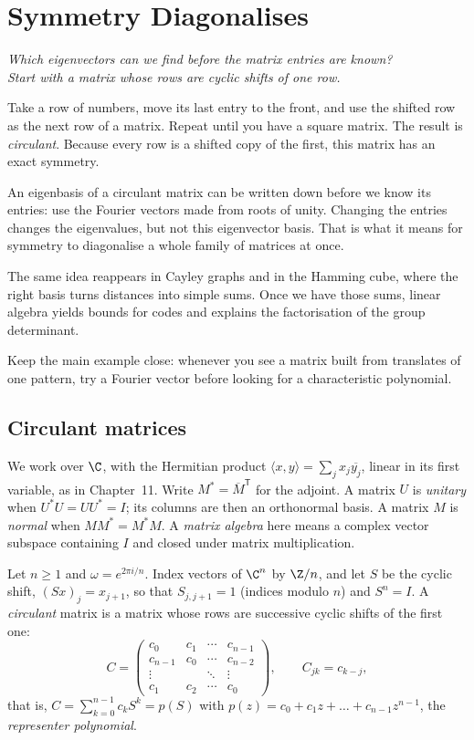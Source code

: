 \chapter{Symmetry Diagonalises}\label{linear:ch:symmetry}

\begin{center}\itshape
Which eigenvectors can we find before the matrix entries are known?\\
Start with a matrix whose rows are cyclic shifts of one row.
\end{center}

Take a row of numbers, move its last entry to the front, and use the shifted row as the next row of a matrix. Repeat until you have a square matrix. The result is \emph{circulant}. Because every row is a shifted copy of the first, this matrix has an exact symmetry.

An eigenbasis of a circulant matrix can be written down before we know its entries: use the Fourier vectors made from roots of unity. Changing the entries changes the eigenvalues, but not this eigenvector basis. That is what it means for symmetry to diagonalise a whole family of matrices at once.

The same idea reappears in Cayley graphs and in the Hamming cube, where the right basis turns distances into simple sums. Once we have those sums, linear algebra yields bounds for codes and explains the factorisation of the group determinant.

Keep the main example close: whenever you see a matrix built from translates of one pattern, try a Fourier vector before looking for a characteristic polynomial.

\section{Circulant matrices}

We work over $\C$, with the Hermitian product
$\langle x,y\rangle=\sum_jx_j\overline{y_j}$, linear in its first variable,
as in Chapter~11. Write $M^*=\overline M^{\mathsf T}$ for the adjoint.
A matrix $U$ is \emph{unitary} when $U^*U=UU^*=I$; its columns are then
an orthonormal basis. A matrix $M$ is \emph{normal} when $MM^*=M^*M$. A \emph{matrix algebra}
here means a complex vector subspace containing $I$ and closed under matrix
multiplication.

Let $n\ge1$ and $\omega=e^{2\pi i/n}$. Index vectors of $\C^n$ by $\Z/n$, and let $S$ be the cyclic shift, $(Sx)_j=x_{j+1}$, so
that $S_{j,j+1}=1$ (indices modulo $n$) and $S^n=I$. A \emph{circulant} matrix is a matrix whose rows are successive cyclic shifts
of the first one:
\[
C=\begin{pmatrix}c_0&c_1&\cdots&c_{n-1}\\c_{n-1}&c_0&\cdots&c_{n-2}\\\vdots&&\ddots&\vdots\\c_1&c_2&\cdots&c_0\end{pmatrix},
\qquad C_{jk}=c_{k-j},
\]
that is, $C=\sum_{k=0}^{n-1}c_kS^k=p(S)$ with $p(z)=c_0+c_1z+\dots+c_{n-1}z^{n-1}$, the \emph{representer polynomial}.

